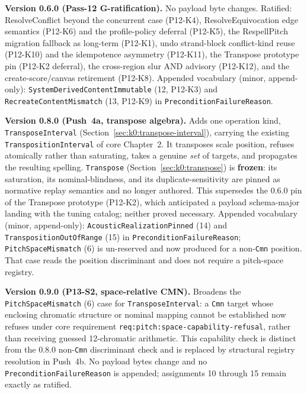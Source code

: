 \documentclass[11pt,letterpaper]{report}
\newcounter{requirement}[chapter]
\begin{document}
\noindent\textbf{Version 0.6.0 (Pass-12 G-ratification).} No payload byte
changes. Ratified: ResolveConflict beyond the concurrent case (P12-K4),
ResolveEquivocation edge semantics (P12-K6) and the profile-policy deferral
(P12-K5), the RespellPitch migration fallback as long-term (P12-K1), undo
strand-block conflict-kind reuse (P12-K10) and the idempotence asymmetry
(P12-K11), the Transpose prototype pin (P12-K2 deferral), the cross-region
slur AND advisory (P12-K12), and the create-score/canvas retirement (P12-K8).
Appended vocabulary (minor, append-only):
\texttt{SystemDerivedContentImmutable} (12, P12-K3) and
\texttt{RecreateContentMismatch} (13, P12-K9) in
\texttt{PreconditionFailureReason}.

\medskip

\noindent\textbf{Version 0.8.0 (Push~4a, transpose algebra).} Adds one
operation kind, \texttt{TransposeInterval}
(Section~\ref{sec:k0:transpose-interval}), carrying the existing
\texttt{TranspositionInterval} of core Chapter~2. It transposes scale
position, refuses
atomically rather than saturating, takes a genuine \emph{set} of targets, and
propagates the resulting spelling. \texttt{Transpose}
(Section~\ref{sec:k0:transpose}) is \textbf{frozen}: its saturation, its
nominal-blindness, and its duplicate-sensitivity are pinned as normative
replay semantics and no longer authored. This supersedes the 0.6.0 pin of the
Transpose prototype (P12-K2), which anticipated a payload schema-major landing
with the tuning catalog; neither proved necessary. Appended vocabulary (minor,
append-only): \texttt{AcousticRealizationPinned} (14) and
\texttt{TranspositionOutOfRange} (15) in \texttt{PreconditionFailureReason};
\texttt{PitchSpaceMismatch} (6) is un-reserved and now produced for a
non-\texttt{Cmn} position. That case reads the position discriminant and does
not require a pitch-space registry.

\medskip

\noindent\textbf{Version 0.9.0 (P13-S2, space-relative CMN).} Broadens the
\texttt{PitchSpaceMismatch} (6) case for \texttt{TransposeInterval}: a
\texttt{Cmn} target whose enclosing chromatic structure or nominal mapping
cannot be established now refuses under core requirement
\texttt{req:pitch:space-capability-refusal}, rather than receiving guessed
12-chromatic arithmetic. This capability check is distinct from the 0.8.0
non-\texttt{Cmn} discriminant check and is replaced by structural registry
resolution in Push~4b. No payload bytes change and no
\texttt{PreconditionFailureReason} is appended; assignments 10 through 15
remain exactly as ratified.
\end{document}
